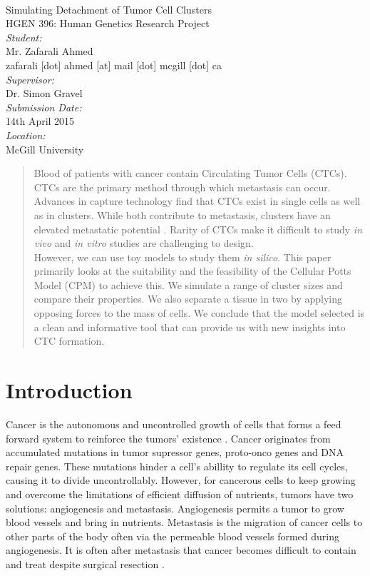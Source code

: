 \documentclass[12pt]{article}
\begin{document}
\begin{titlepage}
	\begin{center}
		~\\[2.0cm]
		{\Huge Simulating Detachment of Tumor Cell Clusters}\\[1.5cm]
		{\Large HGEN 396: Human Genetics Research Project}\\[6.5cm]
		\emph{Student:}\\
		Mr. Zafarali Ahmed\\
		{\scriptsize zafarali [dot] ahmed [at] mail [dot] mcgill [dot] ca} \\[1.0cm]
		\emph{Supervisor:}\\
		Dr. Simon Gravel\\[1.0cm]
		\emph{Submission Date:}\\
		14th April 2015\\[1.0cm]
		\emph{Location:}\\
		McGill University
	\end{center}
\end{titlepage}

\begin{abstract}
Blood of patients with cancer contain Circulating Tumor Cells (CTCs). CTCs are the primary method through which metastasis can occur. Advances in capture technology find that CTCs exist in single cells as well as in clusters. While both contribute to metastasis, clusters have an elevated metastatic potential \cite{Aceto2014}. Rarity of CTCs make it difficult to study \emph{in vivo} and \emph{in vitro} studies are challenging to design. \\
However, we can use toy models to study them \emph{in silico}. This paper primarily looks at the suitability and the feasibility of the Cellular Potts Model (CPM) to achieve this. We simulate a range of cluster sizes and compare their properties. We also separate a tissue in two by applying opposing forces to the mass of cells. We conclude that the model selected is a clean and informative tool that can provide us with new insights into CTC formation.
\end{abstract}

\section{Introduction}
Cancer is the autonomous and uncontrolled growth of cells that forms a feed forward system to reinforce the tumors’ existence \cite{hallmarks}. Cancer originates from accumulated mutations in tumor supressor genes, proto-onco genes and DNA repair genes. These mutations hinder a cell's abillity to regulate its cell cycles, causing it to divide uncontrollably. However, for cancerous cells to keep growing and overcome the limitations of efficient diffusion of nutrients, tumors have two solutions: angiogenesis and metastasis. Angiogenesis permits a tumor to grow blood vessels and bring in nutrients. Metastasis is the migration of cancer cells to other parts of the body often via the permeable blood vessels formed during angiogenesis. It is often after metastasis that cancer becomes difficult to contain and treat despite surgical resection \cite{Demicheli2008}.
\end{document}
